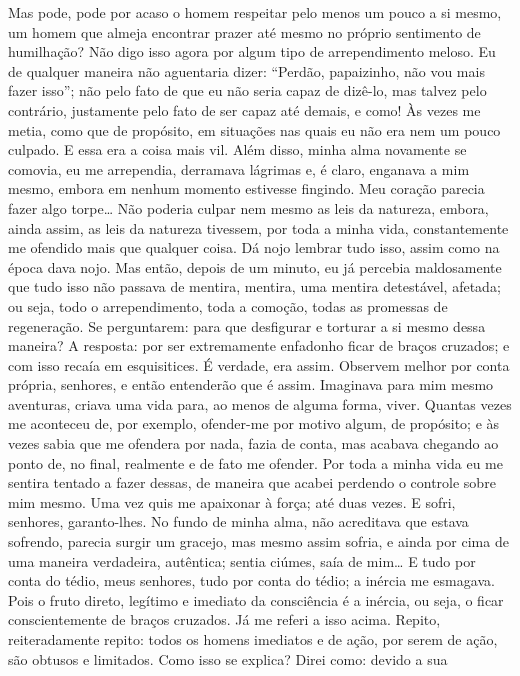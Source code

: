 Mas pode, pode por acaso o homem respeitar pelo menos um pouco a si
mesmo, um homem que almeja encontrar prazer até mesmo no próprio sentimento 
de humilhação? Não digo isso agora por algum tipo de
arrependimento meloso. Eu de qualquer maneira não aguentaria dizer:
“Perdão, papaizinho, não vou mais fazer isso”; não pelo fato de que eu
não seria capaz de dizê-lo, mas talvez pelo contrário, justamente pelo
fato de ser capaz até demais, e como! Às vezes me metia, como que de
propósito, em situações nas quais eu não era nem um pouco culpado. E
essa era a coisa mais vil. Além disso, minha alma novamente se comovia,
eu me arrependia, derramava lágrimas e, é claro, enganava a mim mesmo,
embora em nenhum momento estivesse fingindo. Meu coração parecia fazer
algo torpe\ldots{} Não poderia culpar nem mesmo as leis da natureza, embora,
ainda assim, as leis da natureza tivessem, por toda a minha vida,
constantemente me ofendido mais que qualquer coisa. Dá nojo lembrar
tudo isso, assim como na época dava nojo. Mas então, depois de um
minuto, eu já percebia maldosamente que tudo isso não passava de
mentira, mentira, uma mentira detestável, afetada; ou seja, todo o
arrependimento, toda a comoção, todas as promessas de regeneração. Se
perguntarem: para que desfigurar e torturar a si mesmo dessa maneira? A
resposta: por ser extremamente enfadonho ficar de braços cruzados; e
com isso recaía em esquisitices. É verdade, era assim. Observem melhor
por conta própria, senhores, e então entenderão que é assim. Imaginava
para mim mesmo aventuras, criava uma vida para, ao menos de alguma
forma, viver. Quantas vezes me aconteceu de, por exemplo, ofender-me
por motivo algum, de propósito; e às vezes sabia que me ofendera por
nada, fazia de conta, mas acabava chegando ao ponto de, no final,
realmente e de fato me ofender. Por toda a minha vida eu me sentira
tentado a fazer dessas, de maneira que acabei perdendo o controle sobre
mim mesmo. Uma vez quis me apaixonar à força; até duas vezes. E sofri,
senhores, garanto-lhes. No fundo de minha alma, não acreditava que
estava sofrendo, parecia surgir um gracejo, mas mesmo assim sofria, e
ainda por cima de uma maneira verdadeira, autêntica; sentia ciúmes,
saía de mim\ldots{} E tudo por conta do tédio, meus senhores, tudo por conta
do tédio; a inércia me esmagava. Pois o fruto direto, legítimo e
imediato da consciência é a inércia, ou seja, o ficar conscientemente
de braços cruzados. Já me referi a isso acima. Repito, reiteradamente
repito: todos os homens imediatos e de ação, por serem de ação, são
obtusos e limitados. Como isso se explica? Direi como: devido a sua
